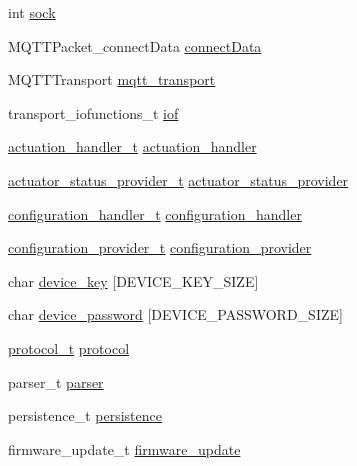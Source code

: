 \begin{DoxyCompactItemize}
\item 
int \hyperlink{structwolk__ctx_a7b2318c99408cdafb7ede7f5d472e100}{sock}
\item 
M\+Q\+T\+T\+Packet\+\_\+connect\+Data \hyperlink{structwolk__ctx_af63fca32333cbb2d7e2b887eff0b2461}{connect\+Data}
\item 
M\+Q\+T\+T\+Transport \hyperlink{structwolk__ctx_a1f8d853e9ce94634dde14f0735207e5c}{mqtt\+\_\+transport}
\item 
transport\+\_\+iofunctions\+\_\+t \hyperlink{structwolk__ctx_a4b934429cb22045256b5757901fe2d66}{iof}
\item 
\hyperlink{wolk__connector_8h_acde87869e807b1774680f3f2b5b04e2f}{actuation\+\_\+handler\+\_\+t} \hyperlink{structwolk__ctx_a2ab241133283e361c6822409f7ec48ca}{actuation\+\_\+handler}
\item 
\hyperlink{wolk__connector_8h_af3e8919a04a293972b64605557287537}{actuator\+\_\+status\+\_\+provider\+\_\+t} \hyperlink{structwolk__ctx_aee7f3ef8dbcfd4f8a3817ef26a1629f6}{actuator\+\_\+status\+\_\+provider}
\item 
\hyperlink{wolk__connector_8h_a6662d0d41546795466cc2b398d8dcb08}{configuration\+\_\+handler\+\_\+t} \hyperlink{structwolk__ctx_a6c0926345d1d56f8fbd3cb50d8f4a804}{configuration\+\_\+handler}
\item 
\hyperlink{wolk__connector_8h_a64d56254d09f9e452751f32b3c5a39d3}{configuration\+\_\+provider\+\_\+t} \hyperlink{structwolk__ctx_a982fc36741a8c8cfb5ad3939363cebf8}{configuration\+\_\+provider}
\item 
char \hyperlink{structwolk__ctx_a4b67ae9b0271566e7dae56c03053906b}{device\+\_\+key} \mbox{[}D\+E\+V\+I\+C\+E\+\_\+\+K\+E\+Y\+\_\+\+S\+I\+ZE\mbox{]}
\item 
char \hyperlink{structwolk__ctx_af6ea97768cfd0445f8b9535e0e2c354b}{device\+\_\+password} \mbox{[}D\+E\+V\+I\+C\+E\+\_\+\+P\+A\+S\+S\+W\+O\+R\+D\+\_\+\+S\+I\+ZE\mbox{]}
\item 
\hyperlink{wolk__connector_8h_a91e19fa4fff461493e1a41f7c7aa4e5f}{protocol\+\_\+t} \hyperlink{structwolk__ctx_af93f257ff60dd00f34455d425207e66f}{protocol}
\item 
parser\+\_\+t \hyperlink{structwolk__ctx_a823bd0528ef9d148f35d244becc4858a}{parser}
\item 
persistence\+\_\+t \hyperlink{structwolk__ctx_a9d7d83e339fcd632b0679db3f86b4293}{persistence}
\item 
firmware\+\_\+update\+\_\+t \hyperlink{structwolk__ctx_ade7e18823de46d7973b729ba3cd52405}{firmware\+\_\+update}

\end{DoxyCompactItemize}
